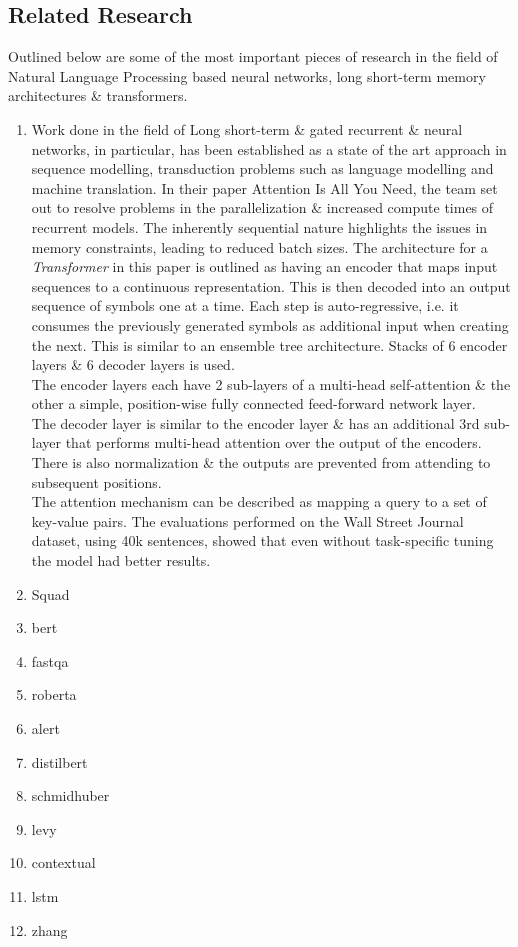 \documentclass[11pt]{article}
\begin{document}
	\subsection{Related Research}\label{rr}
	Outlined below are some of the most important pieces of research in the field of Natural Language Processing based neural networks, long short-term memory architectures \& transformers.
	\begin{enumerate}
		\item Work done in the field of Long short-term \& gated recurrent \citep{lstm} \& \citep{recurrent} neural networks, in particular, has been established as a state of the art approach in sequence modelling, transduction problems such as language modelling and machine translation.
		In their paper Attention Is All You Need,\citep{atayl} the team set out to resolve problems in the parallelization \& increased compute times of recurrent models. The inherently sequential nature highlights the issues in memory constraints, leading to reduced batch sizes.
		The architecture for a \textit{Transformer} in this paper is outlined as having an encoder that maps input sequences to a continuous representation. This is then decoded into an output sequence of symbols one at a time. Each step is auto-regressive, i.e. it consumes the previously generated symbols as additional input when creating the next. This is similar to an ensemble tree architecture. Stacks of 6 encoder layers \& 6 decoder layers is used.\\
		The encoder layers each have 2 sub-layers of a multi-head self-attention \& the other a simple, position-wise fully connected feed-forward network layer.\\
		The decoder layer is similar to the encoder layer \& has an additional 3rd sub-layer that performs multi-head attention over the output of the encoders. There is also normalization \&  the outputs are prevented from attending to subsequent positions. \\ The attention mechanism can be described as mapping a query to a set of key-value pairs\citep{atayl}. The evaluations performed on the Wall Street Journal dataset\citep{wsj}, using 40k sentences, showed that even without task-specific tuning the model had better results.
		
		\item Squad\citep{dataset}
		\item bert \citep{bert}
		\item fastqa \citep{fastQA}
		\item roberta \citep{roberta}
		\item alert \citep{albert}
		\item distilbert \cite{distil}
		\item schmidhuber \citep{schmid}
		\item levy \citep{levy}
		\item contextual \citep{contextual}
		\item lstm \citep{lstm}
		\item zhang \citep{zhang}
	\end{enumerate}
	
\end{document}
